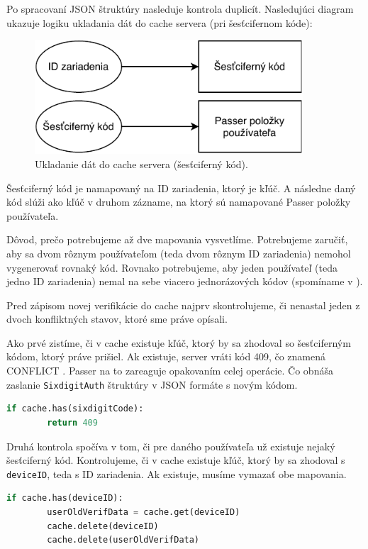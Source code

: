 Po spracovaní JSON štruktúry nasleduje kontrola duplicít. Nasledujúci diagram ukazuje logiku ukladania dát do cache servera (pri šesťcifernom kóde): 
\newline
\begin{figure}[H]
  \centering
  \includegraphics[width=10cm]{img/cache-diagram.pdf}
  \caption{Ukladanie dát do cache servera (šesťciferný kód).}
  \label{cache-diagram}
\end{figure}

Šesťciferný kód je namapovaný na ID zariadenia, ktorý je kľúč. A následne daný kód slúži ako kľúč v druhom zázname, na ktorý sú namapované Passer položky používateľa.

Dôvod, prečo potrebujeme až dve mapovania vysvetlíme. Potrebujeme zaručiť, aby sa dvom rôznym používateľom (teda dvom rôznym ID zariadenia) nemohol vygenerovať rovnaký kód. Rovnako potrebujeme, aby jeden používateľ (teda jedno ID zariadenia) nemal na sebe viacero jednorázových kódov (spomíname v ). 

Pred zápisom novej verifikácie do cache najprv skontrolujeme, či nenastal jeden z dvoch konfliktných stavov, ktoré sme práve opísali.

Ako prvé zistíme, či v cache existuje kľúč, ktorý by sa zhodoval so šesťciferným kódom, ktorý práve prišiel. Ak existuje, server vráti kód 409, čo znamená CONFLICT \cite{http_response}. Passer na to zareaguje opakovaním celej operácie. Čo obnáša zaslanie \texttt{SixdigitAuth} štruktúry v JSON formáte s novým kódom. 
\begin{lstlisting}[language=Python, basicstyle=\small]
    if cache.has(sixdigitCode):
        return 409
\end{lstlisting}

Druhá kontrola spočíva v tom, či pre daného používateľa už existuje nejaký šesťciferný kód. Kontrolujeme, či v cache existuje kľúč, ktorý by sa zhodoval s \texttt{deviceID}, teda s ID zariadenia. Ak existuje, musíme vymazať obe mapovania. 
\begin{lstlisting}[language=Python, basicstyle=\small]
    if cache.has(deviceID):
        userOldVerifData = cache.get(deviceID)
        cache.delete(deviceID)
        cache.delete(userOldVerifData)
\end{lstlisting}

